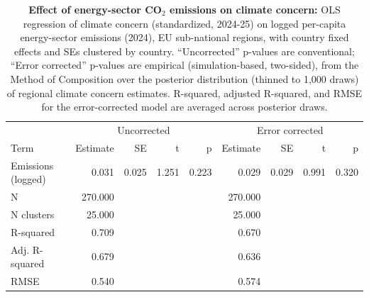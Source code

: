 \begin{table}[ht]
\centering
\begin{tabular}{lrrrrrrrr}
   \hline
 & \multicolumn{4}{c}{Uncorrected} & \multicolumn{4}{c}{Error corrected} \\
 Term & Estimate & SE & t & p & Estimate & SE & t & p \\
\hline
Emissions (logged) & 0.031 & 0.025 & 1.251 & 0.223 & 0.029 & 0.029 & 0.991 & 0.320 \\ 
   \hline
N & 270.000 &  &  &  & 270.000 &  &  &  \\ 
  N clusters & 25.000 &  &  &  & 25.000 &  &  &  \\ 
  R-squared & 0.709 &  &  &  & 0.670 &  &  &  \\ 
  Adj. R-squared & 0.679 &  &  &  & 0.636 &  &  &  \\ 
  RMSE & 0.540 &  &  &  & 0.574 &  &  &  \\ 
   \hline
\end{tabular}
\caption{{\bf Effect of energy-sector CO$_2$ emissions on climate concern:} OLS regression of climate concern (standardized, 2024-25) on logged per-capita energy-sector emissions (2024), 
                        EU sub-national regions, with country fixed effects and SEs clustered by country. ``Uncorrected'' p-values are conventional; ``Error corrected'' p-values are empirical (simulation-based, two-sided), 
                        from the Method of Composition over the posterior distribution (thinned to 1,000 draws) of regional climate concern estimates. R-squared, adjusted R-squared, and RMSE for the error-corrected model are averaged across posterior draws.} 
\label{tab:regression.emissions.concern}
\end{table}
